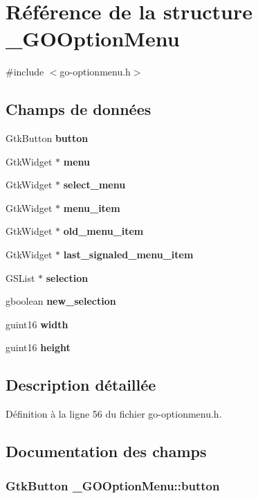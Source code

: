 \section{Référence de la structure \_\-GOOptionMenu}
\label{struct__GOOptionMenu}


{\ttfamily \#include $<$go-\/optionmenu.h$>$}

\subsection*{Champs de données}
\begin{DoxyCompactItemize}
\item 
GtkButton {\bf button}
\item 
GtkWidget $\ast$ {\bf menu}
\item 
GtkWidget $\ast$ {\bf select\_\-menu}
\item 
GtkWidget $\ast$ {\bf menu\_\-item}
\item 
GtkWidget $\ast$ {\bf old\_\-menu\_\-item}
\item 
GtkWidget $\ast$ {\bf last\_\-signaled\_\-menu\_\-item}
\item 
GSList $\ast$ {\bf selection}
\item 
gboolean {\bf new\_\-selection}
\item 
guint16 {\bf width}
\item 
guint16 {\bf height}
\end{DoxyCompactItemize}


\subsection{Description détaillée}


Définition à la ligne 56 du fichier go-\/optionmenu.h.



\subsection{Documentation des champs}
\subsubsection[{button}]{\setlength{\rightskip}{0pt plus 5cm}GtkButton {\bf \_\-GOOptionMenu::button}}\label{struct__GOOptionMenu_a9b79e27189ee6c0d6f152e90ca07a352}



